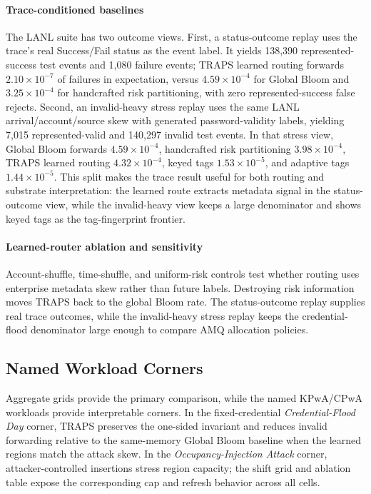 \paragraph{Trace-conditioned baselines}
The LANL suite has two outcome views. First, a status-outcome replay uses the trace's real Success/Fail status as the event label. It yields 138{,}390 represented-success test events and 1{,}080 failure events; TRAPS learned routing forwards \(2.10\times10^{-7}\) of failures in expectation, versus \(4.59\times10^{-4}\) for Global Bloom and \(3.25\times10^{-4}\) for handcrafted risk partitioning, with zero represented-success false rejects. Second, an invalid-heavy stress replay uses the same LANL arrival/account/source skew with generated password-validity labels, yielding 7{,}015 represented-valid and 140{,}297 invalid test events. In that stress view, Global Bloom forwards \(4.59\times10^{-4}\), handcrafted risk partitioning \(3.98\times10^{-4}\), TRAPS learned routing \(4.32\times10^{-4}\), keyed tags \(1.53\times10^{-5}\), and adaptive tags \(1.44\times10^{-5}\). This split makes the trace result useful for both routing and substrate interpretation: the learned route extracts metadata signal in the status-outcome view, while the invalid-heavy view keeps a large denominator and shows keyed tags as the tag-fingerprint frontier.

\paragraph{Learned-router ablation and sensitivity}
Account-shuffle, time-shuffle, and uniform-risk controls test whether routing uses enterprise metadata skew rather than future labels. Destroying risk information moves TRAPS back to the global Bloom rate. The status-outcome replay supplies real trace outcomes, while the invalid-heavy stress replay keeps the credential-flood denominator large enough to compare AMQ allocation policies.

\subsection{Named Workload Corners}
\label{sec:exp-corners}

Aggregate grids provide the primary comparison, while the named KPwA/CPwA workloads provide interpretable corners. In the fixed-credential \emph{Credential-Flood Day} corner, TRAPS preserves the one-sided invariant and reduces invalid forwarding relative to the same-memory Global Bloom baseline when the learned regions match the attack skew. In the \emph{Occupancy-Injection Attack} corner, attacker-controlled insertions stress region capacity; the shift grid and ablation table expose the corresponding cap and refresh behavior across all cells.

